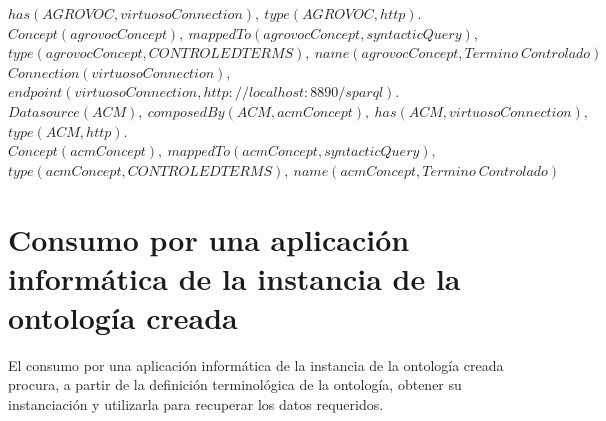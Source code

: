 \begin{minipage}{\textwidth}
$has(AGROVOC, virtuosoConnection), \ type(AGROVOC,http).$ \\
$Concept(agrovocConcept), \ mappedTo(agrovocConcept, syntacticQuery), $\\
$type(agrovocConcept, CONTROLEDTERMS), \ name(agrovocConcept, Termino \ Controlado)$\\
$Connection(virtuosoConnection),$
$endpoint(virtuosoConnection, http{:}//localhost{:}8890/sparql).$\\
$Datasource(ACM), \ composedBy(ACM, acmConcept), \ has(ACM, virtuosoConnection),$\\
$type(ACM,http).$ \\
$Concept(acmConcept), \ mappedTo(acmConcept,syntacticQuery),$\\
$type(acmConcept,CONTROLEDTERMS),  \ name(acmConcept, Termino \ Controlado)$\\
\label{onto:auctoritasDescription}
\end{minipage}




\section{Consumo por una aplicación informática de la instancia de la ontología creada}

El consumo por una aplicación informática de la instancia de la ontología creada procura, a partir de la definición terminológica de la ontología, obtener su instanciación y utilizarla para recuperar los datos requeridos.







